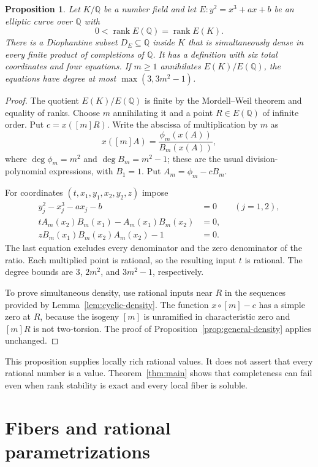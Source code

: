 \documentclass[11pt,a4paper]{article}
\newtheorem{proposition}[theorem]{Proposition}
\theoremstyle{definition}
\newcommand{\Q}{\mathbb Q}\newcommand{\Z}{\mathbb Z}
\begin{document}
\begin{proposition}\label{prop:six-coordinates}
Let $K/\Q$ be a number field and let
$E:y^2=x^3+ax+b$ be an elliptic curve over $\Q$ with
\[
              0<\operatorname{rank}E(\Q)=\operatorname{rank}E(K).
\]
There is a Diophantine subset $D_E\subseteq\Q$ inside $K$ that
is simultaneously dense in every finite product of completions of
$\Q$. It has a definition with six total coordinates and four
equations. If $m\ge1$ annihilates $E(K)/E(\Q)$, the equations have
degree at most $\max(3,3m^2-1)$.
\end{proposition}
\begin{proof}
The quotient $E(K)/E(\Q)$ is finite by the Mordell--Weil theorem
and equality of ranks. Choose $m$ annihilating it and a point
$R\in E(\Q)$ of infinite order. Put $c=x([m]R)$.
Write the abscissa of multiplication by $m$ as
\[
                 x([m]A)=\frac{\phi_m(x(A))}{B_m(x(A))},
\]
where $\deg\phi_m=m^2$ and $\deg B_m=m^2-1$; these are the
usual division-polynomial expressions, with $B_1=1$.
Put $A_m=\phi_m-cB_m$.

For coordinates $(t,x_1,y_1,x_2,y_2,z)$ impose
\begin{align*}
 y_j^2-x_j^3-ax_j-b&=0\qquad(j=1,2),\\
 tA_m(x_2)B_m(x_1)-A_m(x_1)B_m(x_2)&=0,\\
 zB_m(x_1)B_m(x_2)A_m(x_2)-1&=0.
\end{align*}
The last equation excludes every denominator and the zero
denominator of the ratio. Each multiplied point is rational, so
the resulting input $t$ is rational. The degree bounds are
$3$, $2m^2$, and $3m^2-1$, respectively.

To prove simultaneous density, use rational inputs near $R$ in
the sequences provided by Lemma~\ref{lem:cyclic-density}.
The function $x\circ[m]-c$ has a simple zero at $R$, because
the isogeny $[m]$ is unramified in characteristic zero and
$[m]R$ is not two-torsion. The proof of
Proposition~\ref{prop:general-density} applies unchanged.
\end{proof}

This proposition supplies locally rich rational values. It does not
assert that every rational number is a value. Theorem~\ref{thm:main}
shows that completeness can fail even when rank stability is exact
and every local fiber is soluble.

\section{Fibers and rational parametrizations}
\end{document}

